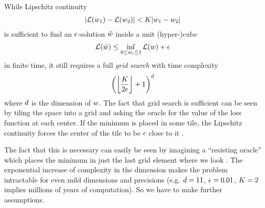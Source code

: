 While Lipschitz continuity 
%
\begin{align*}
	| \mathcal{L}(w_1) - \mathcal{L}(w_2) | < K | w_1 - w_2 |
\end{align*}
%
is sufficient to find an \(\epsilon\)-solution \(\hat{w}\) inside a unit
(hyper-)cube
%
\begin{align*}
	\mathcal{L}(\hat{w}) \le \inf_{ 0\le w_i\le 1} \mathcal{L}(w) + \epsilon
\end{align*}
%
in finite time, it still requires a full \emph{grid search} with time complexity
%
\begin{align*}
	\left(\left\lfloor \frac{K}{2\epsilon}\right\rfloor + 1\right)^d
\end{align*}
%
where \(d\) is the dimension of \(w\). The fact that grid search is
sufficient can be seen by tiling the space into a grid and asking the oracle
for the value of the loss function at each center. If the minimum is placed in
some tile, the Lipschitz continuity forces the center of the tile to be \(\epsilon\)
close to it \parencite[cf.][p. 11]{nesterovLecturesConvexOptimization2018}.

The fact that this is necessary can easily be seen by imagining a ``resisting
oracle'' which places the minimum in just the last grid element where we look
\parencite[cf.][p. 13]{nesterovLecturesConvexOptimization2018}. The exponential
increase of complexity in the dimension makes the problem intractable for even
mild dimensions and precisions (e.g. \(d=11\), \(\epsilon=0.01\), \(K=2\)
implies millions of years of computation). So we have to make further
assumptions. 




\endinput
